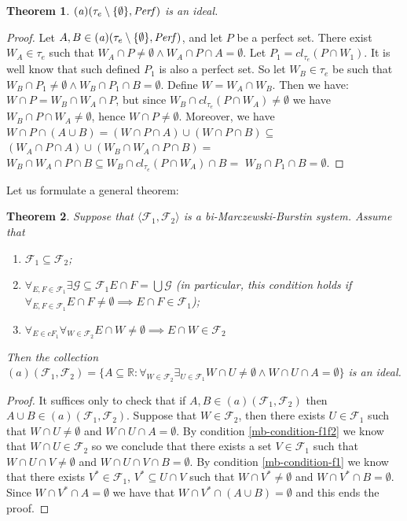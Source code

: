 \documentclass[12pt]{amsart}
\theoremstyle{plain}
\newtheorem{theorem}{Theorem}[section]
\theoremstyle{definition}
\theoremstyle{remark}
\newcommand{\cl}{\mathit{cl}}
\newcommand{\Perf}{{\it Perf}}
\newcommand{\real}{\mathbb{R}}
\newcommand{\cF}{{\mathcal F}}
\newcommand{\cG}{{\mathcal G}}
\newcommand{\aideal}{\mathit{(a)}}
\newcommand{\biMB}{bi-Marczewski-Burstin}
\begin{document}
\begin{theorem}
$\aideal(\tau_e\setminus\lbrace\emptyset\rbrace, \Perf)$ is an ideal.
\end{theorem}

\begin{proof}
Let $A, B \in \aideal(\tau_e\setminus\lbrace\emptyset\rbrace, \Perf)$,
and let $P$ be a perfect set. 
There exist $W_A \in \tau_e$ such that 
$W_A \cap P \not= \emptyset \wedge W_A \cap P \cap A = \emptyset$.
Let $P_1 = \cl_{\tau_e}(P \cap W_1)$. It is well know that such defined
$P_1$ is also a perfect set. So let $W_B \in \tau_e$ 
be such that 
$W_B \cap P_1 \not= \emptyset \wedge W_B \cap P_1 \cap B = \emptyset$.
Define $W = W_A \cap W_B$. Then we have:
$W \cap P = W_B \cap W_A \cap P$, 
but since $W_B \cap \cl_{\tau_e}(P \cap W_A) \not= \emptyset$
we have $W_B \cap P \cap W_A \not= \emptyset$,
hence $W \cap P \not= \emptyset$.
Moreover, we have
$W \cap P \cap (A \cup B) = (W \cap P \cap A) \cup (W \cap P \cap B) \subseteq$
$(W_A \cap P \cap A) \cup (W_B \cap W_A \cap P \cap B) =$
$W_B \cap W_A \cap P \cap B \subseteq W_B \cap \cl_{\tau_e} (P \cap W_A) \cap B =$
$W_B \cap P_1 \cap B = \emptyset$.
\end{proof}

Let us formulate a general theorem:

\begin{theorem}
Suppose that $\langle \cF_1, \cF_2 \rangle$ is a \biMB{} system.
Assume that 
\begin{enumerate}	
\item
\label{mb-condition-subset}
  $\cF_1 \subseteq \cF_2$;
\item 
\label{mb-condition-f1}
 $\forall_{E,F \in \cF_1} \exists{\cG \subseteq \cF_1} E \cap F 
 = \bigcup \cG$
 (in particular, 
 this condition holds if $\forall_{E,F \in \cF_1} E \cap F \not= \emptyset \implies E \cap F \in \cF_1$);  
\item
\label{mb-condition-f1f2}
  $\forall_{E \in cF_1} \forall_{W \in \cF_2} E \cap W \not= \emptyset \implies E \cap W \in \cF_2$  
\end{enumerate}	
Then the collection
$\aideal(\cF_1, \cF_2) = \lbrace A \subseteq \real\colon 
\forall_{W\in \cF_2} \exists_{U \in \cF_1}
W \cap U \not= \emptyset \wedge W \cap U \cap A = \emptyset
\rbrace$ 
is an ideal. 
\end{theorem}
\begin{proof}
It suffices only to check that if $A, B \in \aideal(\cF_1, \cF_2)$ then
$A\cup B \in \aideal(\cF_1, \cF_2)$.
Suppose that $W \in \cF_2$, then there exists $U\in\cF_1$
such that 
$W \cap U \not= \emptyset$ and $W \cap U \cap A = \emptyset$.
By condition \ref{mb-condition-f1f2} 
we know that $W \cap U \in \cF_2$ so
we conclude that
there exists a set $V \in \cF_1$ such that
$W \cap U \cap V \not= \emptyset$ and $W \cap U \cap V \cap B = \emptyset$.
By condition \ref{mb-condition-f1} we know that 
there exists $V^* \in \cF_1$, $V^* \subseteq U \cap V$ such that 
$W \cap V^* \not= \emptyset$ and $W \cap V^* \cap B = \emptyset$.
Since $W \cap V^* \cap A = \emptyset$ we have that 
$W \cap V^* \cap (A \cup B) = \emptyset$
and this ends the proof.
\end{proof}
\end{document}
